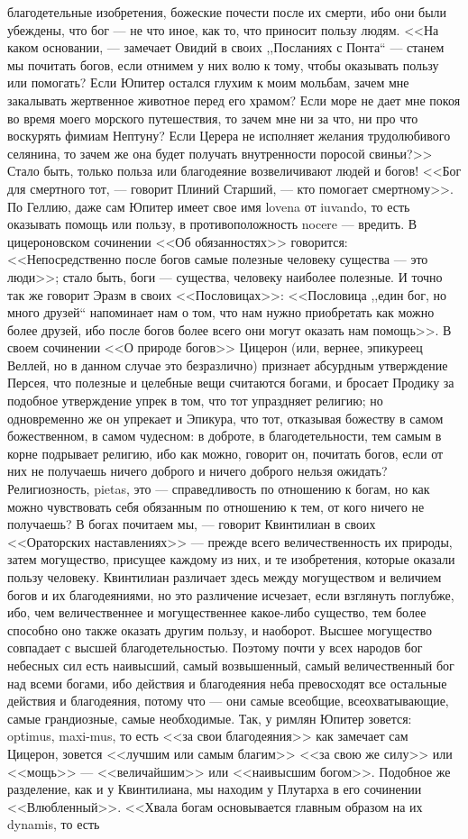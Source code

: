 \documentclass[12pt]{article}
\begin{document}
благодетельные изобретения, божеские почести после их смерти, ибо они были убеждены, что бог --- не что иное, как то, что приносит пользу людям. <<На каком основании, --- замечает Овидий в своих ,,Посланиях с Понта``  --- станем мы почитать богов, если отнимем у них волю к тому, чтобы оказывать пользу или помогать? Если Юпитер остался глухим к моим мольбам, зачем мне закалывать жертвенное животное перед его храмом? Если море не дает мне покоя во время моего морского путешествия, то зачем мне ни за что, ни про что воскурять фимиам Нептуну? Если Церера не исполняет желания трудолюбивого селянина, то зачем же она будет получать внутренности поросой свиньи?>> Стало быть, только польза или благодеяние возвеличивают людей и богов! <<Бог для смертного тот, --- говорит Плиний Старший, --- кто помогает смертному>>. По Геллию, даже сам Юпитер имеет свое имя lovena от iuvando, то есть оказывать помощь или пользу, в противоположность nocere --- вредить. В цицероновском сочинении <<Об обязанностях>> говорится: <<Непосредственно после богов самые полезные человеку существа --- это люди>>; стало быть, боги --- существа, человеку наиболее полезные. И точно так же говорит Эразм в своих <<Пословицах>>: <<Пословица ,,един бог, но много друзей`` напоминает нам о том, что нам нужно приобретать как можно более друзей, ибо после богов более всего они могут оказать нам помощь>>. В своем сочинении <<О природе богов>> Цицерон (или, вернее, эпикуреец Веллей, но в данном случае это безразлично) признает абсурдным утверждение Персея, что полезные и целебные вещи считаются богами, и бросает Продику за подобное утверждение упрек в том, что тот упраздняет религию; но одновременно же он упрекает и Эпикура, что тот, отказывая божеству в самом божественном, в самом чудесном: в доброте, в благодетельности, тем самым в корне подрывает религию, ибо как можно, говорит он, почитать богов, если от них не получаешь ничего доброго и ничего доброго нельзя ожидать? Религиозность, pietas, это --- справедливость по отношению к богам, но как можно чувствовать себя обязанным по отношению к тем, от кого ничего не получаешь? В богах почитаем мы, --- говорит Квинтилиан в своих <<Ораторских наставлениях>>  --- прежде всего величественность их природы, затем могущество, присущее каждому из них, и те изобретения, которые оказали пользу человеку. Квинтилиан различает здесь между могуществом и величием богов и их благодеяниями, но это различение исчезает, если взглянуть поглубже, ибо, чем величественнее и могущественнее какое-либо существо, тем более способно оно также оказать другим пользу, и наоборот. Высшее могущество совпадает с высшей благодетельностью. Поэтому почти у всех народов бог небесных сил есть наивысший, самый возвышенный, самый величественный бог над всеми богами, ибо действия и благодеяния неба превосходят все остальные действия и благодеяния, потому что --- они самые всеобщие, всеохватывающие, самые грандиозные, самые необходимые. Так, у римлян Юпитер зовется: optimus, maxi-mus, то есть <<за свои благодеяния>>  как замечает сам Цицерон, зовется <<лучшим или самым благим>>  <<за свою же силу>> или <<мощь>> --- <<величайшим>> или <<наивысшим богом>>. Подобное же разделение, как и у Квинтилиана, мы находим у Плутарха в его сочинении <<Влюбленный>>. <<Хвала богам основывается главным образом на их dynamis, то есть 
\end{document}
